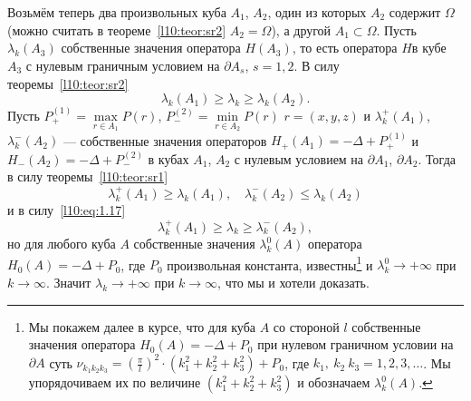 Возьмём теперь два произвольных куба $A_1$, $A_2$, один из которых $A_2$ содержит $\Omega$ (можно считать в теореме~\ref{l10:teor:sr2} $A_2=\widehat{\Omega}$), а другой $A_1\subset\Omega$. Пусть $\lambda_k(A_3)$ собственные значения оператора $H(A_3)$, то есть оператора $H$в кубе $A_3$ с нулевым граничным условием на $\partial A_s$, $s=1,2$. В силу теоремы~\ref{l10:teor:sr2}
\begin{equation}\label{l10:eq:1.17}
	\lambda_k(A_1)\geqslant\lambda_k\geqslant\lambda_k(A_2).
\end{equation}
Пусть $P_{+}^{(1)}=\max\limits_{r\in A_1}P(r)$, $P_{-}^{(2)}=\min\limits_{r\in A_2}P(r)$ $r=(x,y,z)$ и $\lambda_k^{+}(A_1)$, $\lambda_k^{-}(A_2)$ --- собственные значения операторов $H_{+}(A_1)=-\Delta+P_{+}^{(1)}$ и $H_{-}(A_2)=-\Delta+P_{-}^{(2)}$ в кубах $A_1$, $A_2$ с нулевым условием на $\partial A_1$, $\partial A_2$. Тогда в силу теоремы~\ref{l10:teor:sr1}
\begin{equation*}
	\lambda_k^{+}(A_1)\geqslant\lambda_k(A_1),\quad\lambda_k^{-}(A_2)\leqslant\lambda_k(A_2)
\end{equation*} 
и в силу~\eqref{l10:eq:1.17}
\begin{equation*}
	\lambda_k^{+}(A_1)\geqslant\lambda_k\geqslant\lambda_k^{-}(A_2),
\end{equation*} 
но для любого куба $A$ собственные значения $\lambda_k^0(A)$ оператора $H_0(A)=-\Delta+P_0$, где $P_0$ произвольная константа, известны\footnote{Мы покажем далее в курсе, что для куба $A$ со стороной $l$ собственные значения оператора $H_0(A)=-\Delta+P_0$ при нулевом граничном условии на $\partial A$ суть $\displaystyle\nu_{k_1 k_2 k_3}=\left(\frac{\pi}{l}\right)^2\cdot\left(k_1^2+k_2^2+k_3^2\right)+P_0$, где $k_1,\ k_2\ k_3=1,2,3,\ldots$. Мы упорядочиваем их по величине $\left(k_1^2+k_2^2+k_3^2\right)$ и обозначаем $\lambda_k^0(A)$.}  и $\lambda_k^0\to+\infty$ при $k\to\infty$. Значит $\lambda_k\to+\infty$ при $k\to\infty$, что мы и хотели доказать.
